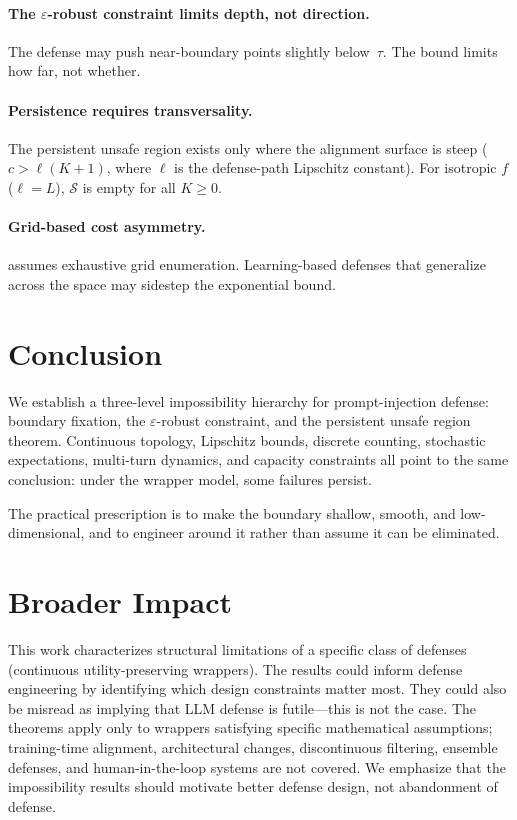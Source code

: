 \documentclass[11pt]{article}
\begin{document}
\paragraph{The $\varepsilon$-robust constraint limits depth, not direction.}
The defense may push near-boundary points slightly below~$\tau$. The
bound limits how far, not whether.

\paragraph{Persistence requires transversality.}
The persistent unsafe region exists only where the alignment surface
is steep ($c > \ell(K+1)$, where $\ell$ is the defense-path
Lipschitz constant). For isotropic $f$ ($\ell = L$), $\mathcal{S}$
is empty for all $K \geq 0$.

\paragraph{Grid-based cost asymmetry.}
 assumes exhaustive grid enumeration. Learning-based
defenses that generalize across the space may sidestep the exponential
bound.


\section{Conclusion}
\label{sec:conclusion}

We establish a three-level impossibility hierarchy for prompt-injection
defense: boundary fixation, the $\varepsilon$-robust constraint, and the
persistent unsafe region theorem. Continuous topology, Lipschitz bounds,
discrete counting, stochastic expectations, multi-turn dynamics, and
capacity constraints all point to the same conclusion: under the
wrapper model, some failures persist. 

The practical prescription is to make the boundary shallow, smooth,
and low-dimensional, and to engineer around it rather than assume it
can be eliminated.

\section*{Broader Impact}
This work characterizes structural limitations of a specific class
of defenses (continuous utility-preserving wrappers). The results
could inform defense engineering by identifying which design
constraints matter most. They could also be misread as implying
that LLM defense is futile---this is not the case. The theorems
apply only to wrappers satisfying specific mathematical assumptions;
training-time alignment, architectural changes, discontinuous
filtering, ensemble defenses, and human-in-the-loop systems are
not covered. We emphasize that the impossibility results should
motivate better defense design, not abandonment of defense.
\end{document}
